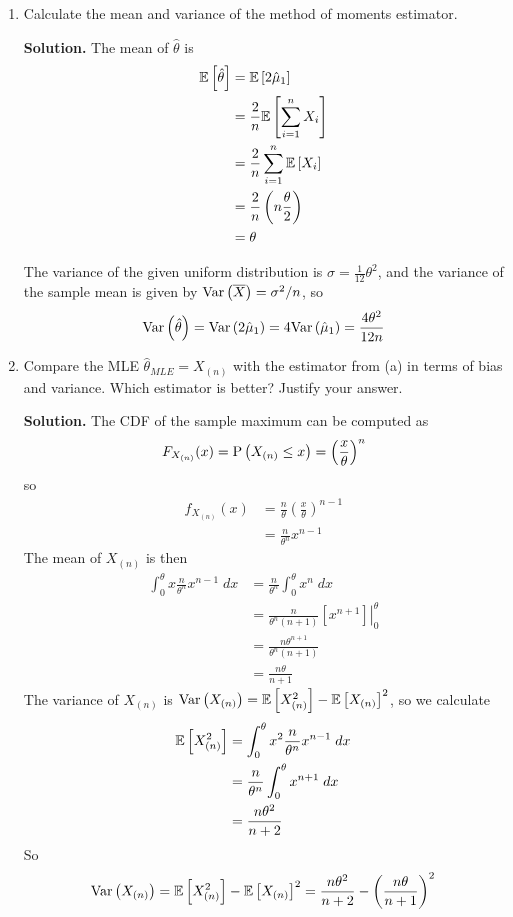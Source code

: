 \documentclass[titlepage]{article}
\begin{document}
\begin{enumerate}
\begin{enumerate}
  \item Calculate the mean and variance of the method of moments estimator.

  \textbf{Solution.} The mean of $\hat{\theta}$ is
  \[\begin{aligned}
  \ev{\hat{\theta}} &= \ev{2\hat{\mu}_1} \\
                    &= \frac{2}{n} \ev{\sum_{i=1}^n X_i} \\
                    &= \frac{2}{n} \sum_{i=1}^n \ev{X_i} \\
                    &= \frac{2}{n}\left(n\frac{\theta}{2}\right)\\
                    &= \theta
  \end{aligned}\]

  The variance of the given uniform distribution is $\sigma = \frac{1}{12}\theta^2$, and the variance of the sample mean is given by $\var{\Xbar} = \sigma^2 / n$, so
  \[\var{\hat{\theta}} = \var{2\hat{\mu}_1} = 4 \var{\hat{\mu}_1} = \frac{4\theta^2}{12n}\]

  \item Compare the MLE $\hat{\theta}_{MLE} = X_{(n)}$ with the estimator from (a) in terms of bias and variance. Which estimator is better? Justify your answer.

  \textbf{Solution.} The CDF of the sample maximum can be computed as
    \[F_{X_{(n)}}(x) = \P{X_{(n)} \leq x} = \left(\frac{x}{\theta}\right)^n\]
  so
    \[\begin{aligned}
    f_{X_{(n)}}(x) &= \frac{n}{\theta}\left(\frac{x}{\theta}\right)^{n-1}\\
    &= \frac{n}{\theta^n}x^{n-1}
    \end{aligned}\]
  The mean of $X_{(n)}$ is then
    \[\begin{aligned}
    \int_0^\theta x \frac{n}{\theta^n}x^{n-1} \; dx
    &= \frac{n}{\theta^n} \int_0^\theta x^n \; dx \\
    &= \frac{n}{\theta^n(n + 1)} \left.\left[x^{n+1}\right]\right|_0^\theta \\
    &= \frac{n\theta^{n+1}}{\theta^n(n + 1)} \\
    &= \frac{n\theta}{n+1}
    \end{aligned}\]
  The variance of $X_{(n)}$ is $\var{X_{(n)}} = \ev{X_{(n)}^2} - \ev{X_{(n)}}^2$, so we calculate
  \[\begin{aligned}
  \ev{X_{(n)}^2} &= \int_0^\theta x^2 \frac{n}{\theta^n}x^{n-1}\;dx\\
   &= \frac{n}{\theta^n} \int_0^\theta x^{n+1} \; dx \\
   &= \frac{n\theta^2}{n+2}
  \end{aligned}\]
  So
  \[\var{X_{(n)}} = \ev{X_{(n)}^2} - \ev{X_{(n)}}^2 = \frac{n\theta^2}{n+2} - \left(\frac{n\theta}{n+1}\right)^2\]


\end{enumerate}
\end{enumerate}
\end{document}
